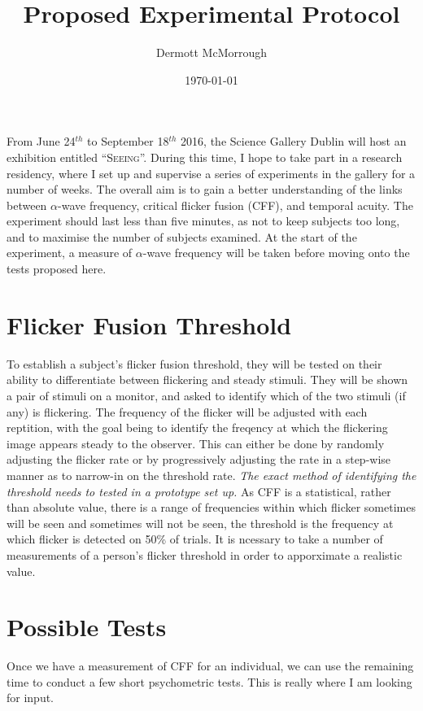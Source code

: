 \documentclass[12pt]{article}
\title{Proposed Experimental Protocol}
\author{Dermott McMorrough}
\date{\today}
\begin{document}
 
\maketitle

From June 24$^{th}$ to September 18$^{th}$ 2016, the Science Gallery Dublin will host an exhibition entitled ``\textsc{Seeing}''. During this time, I hope to take part in a research residency, where I set up and supervise a series of experiments in the gallery for a number of weeks. The overall aim is to gain a better understanding of the links between $\alpha$-wave frequency, critical flicker fusion (CFF), and temporal acuity. 
The experiment should last less than five minutes, as not to keep subjects too long, and to maximise the number of subjects examined. At the start of the experiment, a measure of $\alpha$-wave frequency will be taken before moving onto the tests proposed here.

\section{Flicker Fusion Threshold}
To establish a subject's flicker fusion threshold, they will be tested on their ability to differentiate between flickering and steady stimuli. They will be shown a pair of stimuli on a monitor, and asked to identify which of the two stimuli (if any) is flickering. The frequency of the flicker will be adjusted with each reptition, with the goal being to identify the freqency at which the flickering image appears steady to the observer. This can either be done by randomly adjusting the flicker rate or by progressively adjusting the rate in a step-wise manner as to narrow-in on the threshold rate. \textit{The exact method of identifying the threshold needs to tested in a prototype set up.}
As CFF is a statistical, rather than absolute value, there is a range of frequencies within which flicker sometimes will be seen and sometimes will not be seen, the threshold is the frequency at which flicker is detected on 50\% of trials. It is ncessary to take a number of measurements of a person's flicker threshold in order to apporximate a realistic value.  

\section{Possible Tests}
Once we have a measurement of CFF for an individual, we can use the remaining time to conduct a few short psychometric tests. This is really where I am looking for input.  
\end{document}
